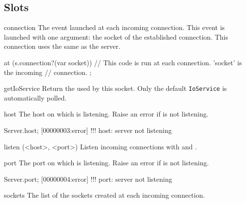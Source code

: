 \subsection{Slots}
\begin{urbiscriptapi}
\item[connection]
  The event launched at each incoming connection. This event is
  launched with one argument: the socket of the established connection. This
  connection uses the same  as the server.
\begin{urbiscript}
at (s.connection?(var socket))
{
  // This code is run at each connection. 'socket' is the incoming
  // connection.
};
\end{urbiscript}

\item[getIoService]
  Return the  used by this socket. Only the default
  \lstinline|IoService| is automatically polled.

\item[host]
  The host on which \this is listening. Raise an error if
  \this is not listening.
\begin{urbiscript}
Server.host;
[00000003:error] !!! host: server not listening
\end{urbiscript}

\item[listen](<host>, <port>)%
  Listen incoming connections with  and .

\item[port]
  The port on which \this is listening. Raise an error if
  \this is not listening.
\begin{urbiscript}
Server.port;
[00000004:error] !!! port: server not listening
\end{urbiscript}

\item[sockets]
  The list of the sockets created at each incoming connection.
\end{urbiscriptapi}


